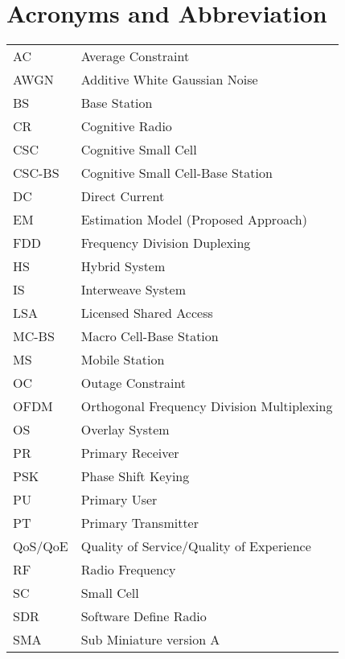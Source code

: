 
\chapter{Acronyms and Abbreviation}
\renewcommand{\arraystretch}{1.4}
\begin{longtable}{p{}p{}}
   	AC 	&	Average Constraint\\
   	AWGN	&	Additive White Gaussian Noise \\
	BS	&	Base Station \\
        CR 	&	Cognitive Radio \\
        CSC 	&	Cognitive Small Cell\\
	CSC-BS	&	Cognitive Small Cell-Base Station \\
	DC 	&	Direct Current \\
  	EM	&	Estimation Model (Proposed Approach) \\
	FDD	& 	Frequency Division Duplexing \\
	HS	& 	Hybrid System \\
	IS	& 	Interweave System \\
	LSA	& 	Licensed Shared Access \\
	MC-BS	&	Macro Cell-Base Station \\
	MS	&	Mobile Station \\
	OC	&	Outage Constraint \\
	OFDM	&	Orthogonal Frequency Division Multiplexing\\
	OS	&	Overlay System \\
	PR	& 	Primary Receiver \\
	PSK	& 	Phase Shift Keying \\
	PU	& 	Primary User \\
	PT	& 	Primary Transmitter \\
	QoS/QoE & 	Quality of Service/Quality of Experience \\
	RF	&	Radio Frequency \\
	SC 	&	Small Cell \\
	SDR 	&	Software Define Radio \\
	SMA 	&	Sub Miniature version A\\

\end{longtable}
